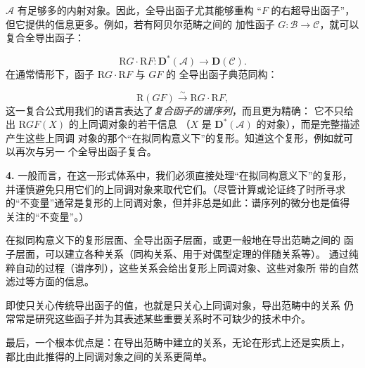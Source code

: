 \clearpage
{}
$\mathcal A$ 有足够多的内射对象。因此，全导出函子尤其能够重构
“$F$ 的右超导出函子”，但它提供的信息更多。例如，若有阿贝尔范畴之间的
加性函子 $G:\mathcal B\to\mathcal C$，就可以复合全导出函子：

\[
\mathrm R G\mathbin{\cdot}\mathrm R F:
\mathbf D^*(\mathcal A)\longrightarrow\mathbf D(\mathcal C).
\]
在通常情形下，函子 $\mathrm R G\mathbin{\cdot}\mathrm R F$ 与 $GF$ 的
全导出函子典范同构：

\[
\mathrm R(GF)\xrightarrow{\sim}
\mathrm R G\mathbin{\cdot}\mathrm R F,
\]
这一复合公式用我们的语言表达了\emph{复合函子的谱序列}，而且更为精确：
它不只给出 $\mathrm R GF(X)$ 的上同调对象的若干信息
（$X$ 是 $\mathbf D^*(\mathcal A)$ 的对象），而是完整描述产生这些上同调
对象的那个“在拟同构意义下”的复形。知道这个复形，例如就可以再次与另一
个全导出函子复合。

\noindent\textbf{4.}\quad
一般而言，在这一形式体系中，我们必须直接处理“在拟同构意义下”的复形，
并谨慎避免只用它们的上同调对象来取代它们。（尽管计算或论证终了时所寻求
的“不变量”通常是复形的上同调对象，但并非总是如此：谱序列的微分也是值得
关注的“不变量”。）

在拟同构意义下的复形层面、全导出函子层面，或更一般地在导出范畴之间的
函子层面，可以建立各种关系（同构关系、用于对偶型定理的伴随关系等）。
通过纯粹自动的过程（谱序列），这些关系会给出复形上同调对象、这些对象所
带的自然滤过等方面的信息。

即使只关心传统导出函子的值，也就是只关心上同调对象，导出范畴中的关系
仍常常是研究这些函子并为其表述某些重要关系时不可缺少的技术中介。

最后，一个根本优点是：在导出范畴中建立的关系，无论在形式上还是实质上，
都比由此推得的上同调对象之间的关系更简单。
